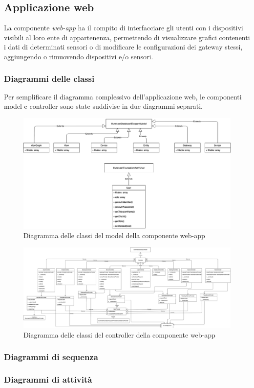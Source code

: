 \subsection{Applicazione web}
La componente \textit{web-app} ha il compito di interfacciare gli utenti con i dispositivi visibili al loro ente di appartenenza, permettendo di visualizzare grafici contenenti i dati di determinati sensori o di modificare le configurazioni dei gateway stessi, aggiungendo o rimuovendo dispositivi e/o sensori. 

	\subsubsection{Diagrammi delle classi}
	Per semplificare il diagramma complessivo dell'applicazione web, le componenti model e controller sono state suddivise in due diagrammi separati.
	\begin{landscape}
		\begin{figure}[H]
			\centering
			\includegraphics[scale=0.600]{res/images/WEBAPP/ModelWebApp.png}
			\caption{Diagramma delle classi del model della componente web-app}
		\end{figure}
		\begin{figure}[H]
			\centering
			\includegraphics[scale=0.300]{res/images/WEBAPP/ControllerWebApp.png}
			\caption{Diagramma delle classi del controller della componente web-app}
		\end{figure}
		\end{landscape}
	\subsubsection{Diagrammi di sequenza}
	\subsubsection{Diagrammi di attività}